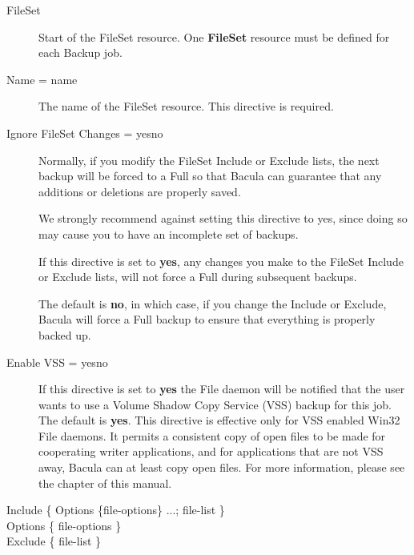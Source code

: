 \begin{description}

\item [FileSet]
Start of the FileSet resource. One {\bf FileSet}  resource must be
defined for each Backup job.

\item [Name = \lt{}name\gt{}]
   The name of the FileSet resource.  This directive is required. 

\item [Ignore FileSet Changes = \lt{}yes\vb{}no\gt{}]
   Normally, if you modify the FileSet Include or Exclude lists,
   the next backup will be forced to a Full so that Bacula can
   guarantee that any additions or deletions are properly saved.

   We strongly recommend against setting this directive to yes, 
   since doing so may cause you to have an incomplete set of backups.

   If this directive is set to {\bf yes}, any changes you make to the
   FileSet Include or Exclude lists, will not force a Full during 
   subsequent backups.

   The default is {\bf no}, in which case, if you change the Include or
   Exclude, Bacula will force a Full backup to ensure that everything is
   properly backed up.

\item [Enable VSS = \lt{}yes\vb{}no\gt{}]
  If this directive is set to {\bf yes} the File daemon will be notified
  that the user wants to use a Volume Shadow Copy Service (VSS) backup
  for this job. The default is {\bf yes}. This directive is effective
  only for VSS enabled Win32 File daemons. It permits a consistent copy
  of open files to be made for cooperating writer applications, and for
  applications that are not VSS away, Bacula can at least copy open files.
  For more information, please see the
   chapter of this manual.


\item [Include \{ Options \{\lt{}file-options\gt{}\} ...;
   \lt{}file-list\gt{} \} ]

\item [Options \{ \lt{}file-options\gt{} \} ]

\item [Exclude \{ \lt{}file-list\gt{} \}]


\end{description}

